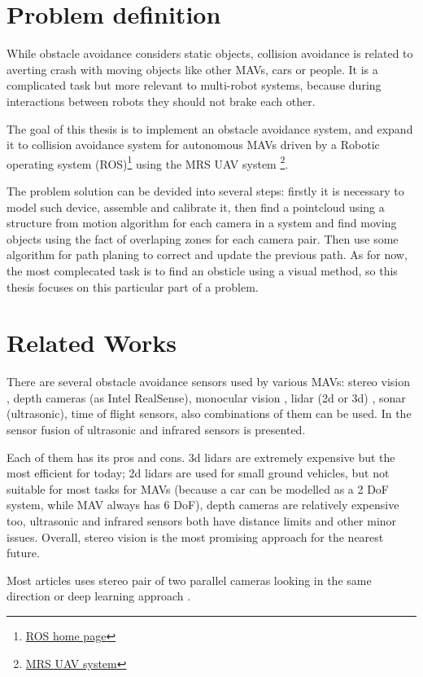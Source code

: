 \section{Problem definition}
While obstacle avoidance considers static objects, collision avoidance is related to averting crash with moving objects like other MAVs, cars or people. It is a complicated task but more relevant to multi-robot systems, because during interactions between robots they should not brake each other. 

The goal of this thesis is to implement an obstacle avoidance system, and expand it to collision avoidance system for autonomous MAVs driven by a Robotic operating system (ROS)\footnote{\href{https://www.ros.org/}{ROS home page}} using the MRS UAV system \cite{Baca2021} \footnote{\href{https://github.com/ctu-mrs/mrs_uav_system}{MRS UAV system}}.

The problem solution can be devided into several steps: firstly it is necessary to model such device, assemble and calibrate it, then find a pointcloud using a structure from motion algorithm for each camera in a system and find moving objects using the fact of overlaping zones for each camera pair. Then use some algorithm for path planing to correct and update the previous path. As for now, the most complecated task is to find an obsticle using a visual method, so this thesis focuses on this particular part of a problem.

\section{Related Works}

There are several obstacle avoidance sensors used by various MAVs: stereo vision \cite{Ruf2018}, depth cameras (as Intel RealSense), monocular vision \cite{Mejias2010}, lidar (2d or 3d) \cite{Ramasamy2016}, sonar (ultrasonic), time of flight sensors, also combinations of them can be used. In \cite{Rambabu2015} the sensor fusion of ultrasonic and infrared sensors is presented.

Each of them has its pros and cons. 3d lidars are extremely expensive but the most efficient for today; 2d lidars are used for small ground vehicles, but not suitable for most tasks for MAVs (because a car can be modelled as a 2 DoF system, while MAV always has 6 DoF), depth cameras are relatively expensive too, ultrasonic and infrared sensors both have distance limits and other minor issues. Overall, stereo vision is the most promising approach for the nearest future.

Most articles uses stereo pair of two parallel cameras looking in the same direction \cite{Yu2018, Lin2021, Xiao2019} or deep learning approach \cite{Back2020, FragaLamas2019, Park2020, Roghair2021}.